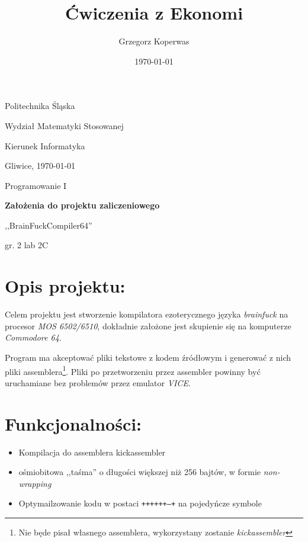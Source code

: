 \documentclass[a4paper,12pt]{article}
\title{Ćwiczenia z Ekonomi}
\author{Grzegorz Koperwas}
\date{\today}
\begin{document}
\begin{titlepage}
    Politechnika Śląska

    Wydział Matematyki Stosowanej

    Kierunek Informatyka


    \begin{center}
        Gliwice, \today

        \vspace{2cm}

        \Large{Programowanie I}

        \vspace{1cm}

        \Large{\bfseries{Założenia do projektu zaliczeniowego}}

        \vspace{1cm}

        \large{,,BrainFuckCompiler64''}

        \vspace{2cm}

        \theauthor{} gr. 2 lab 2C
	\end{center}
	\thispagestyle{empty}
\end{titlepage}

\section{Opis projektu:}
Celem projektu jest stworzenie kompilatora ezoterycznego języka \emph{brainfuck} na procesor \emph{MOS 6502/6510}, dokładnie założone jest skupienie się na komputerze \emph{Commodore 64}.

Program ma akceptować pliki tekstowe z kodem źródłowym i generować z nich pliki assemblera\footnote{Nie będe pisał własnego assemblera, wykorzystany zostanie \emph{kickassembler}}. Pliki po przetworzeniu przez assembler powinny być uruchamiane bez problemów przez emulator \emph{VICE}.

\section{Funkcjonalności:}
\begin{itemize}
    \item Kompilacja do assemblera kickassembler
    \item ośmiobitowa ,,taśma'' o długości większej niż 256 bajtów, w formie \emph{non-wrapping}
    \item Optymailzowanie kodu w postaci \texttt{++++++--+} na pojedyńcze symbole
\end{itemize}
\end{document}
